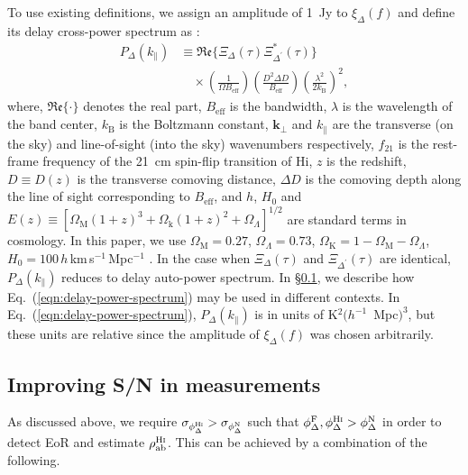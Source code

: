 \documentclass[
reprint,
superscriptaddress,
amsmath,
amssymb,
aps,
prd
]{revtex4-1}
\begin{document}
To use existing definitions, we assign an amplitude of 1~Jy to $\xi_\Delta(f)$ and define its delay cross-power spectrum as \cite{par12a,thy15a}:
\begin{align}
  P_\Delta(k_\parallel) &\equiv \mathfrak{Re}\bigg\{\Xi_\Delta(\tau)\Xi_{\Delta^\prime}^*(\tau)\bigg\} \nonumber\\
  &\quad \times \left(\frac{1}{\Omega B_\textrm{eff}}\right)\left(\frac{D^2\Delta D}{B_\textrm{eff}}\right)\left(\frac{\lambda^2}{2k_\textrm{B}}\right)^2, \label{eqn:delay-power-spectrum}
\end{align}
where, $\mathfrak{Re}\{\cdot\}$ denotes the real part, $B_\textrm{eff}$ is the bandwidth, $\lambda$ is the wavelength of the band center, $k_\textrm{B}$ is the Boltzmann constant, $\boldsymbol{k}_\perp$ and $k_\parallel$ are the transverse (on the sky) and line-of-sight (into the sky) wavenumbers respectively, $f_{21}$ is the rest-frame frequency of the 21~cm spin-flip transition of H{\sc i}, $z$ is the redshift, $D\equiv D(z)$ is the transverse comoving distance, $\Delta D$ is the comoving depth along the line of sight corresponding to $B_\textrm{eff}$, and $h$, $H_0$ and $E(z)\equiv [\Omega_\textrm{M}(1+z)^3+\Omega_\textrm{k}(1+z)^2+\Omega_\Lambda]^{1/2}$ are standard terms in cosmology. In this paper, we use $\Omega_\textrm{M}=0.27$, $\Omega_\Lambda=0.73$, $\Omega_\textrm{K}=1-\Omega_\textrm{M}-\Omega_\Lambda$, $H_0=100\,h\,$km$\,$s$^{-1}\,$Mpc$^{-1}$ \cite{wmap9cosmo}. In the case when $\Xi_\Delta(\tau)$ and $\Xi_{\Delta^\prime}(\tau)$ are identical, $P_\Delta(k_\parallel)$ reduces to delay auto-power spectrum. In \S\ref{sec:averaging}, we describe how Eq.~(\ref{eqn:delay-power-spectrum}) may be used in different contexts. In Eq.~(\ref{eqn:delay-power-spectrum}), $P_\Delta(k_\parallel)$ is in units of K$^2 (h^{-1}$~Mpc$)^3$, but these units are relative since the amplitude of $\xi_\Delta(f)$ was chosen arbitrarily. 

\subsection{Improving S/N in measurements}\label{sec:averaging}

As discussed above, we require $\sigma_{\phi_\Delta^\textrm{H{\sc i}}} > \sigma_{\phi_\Delta^\textrm{N}}$ such that $\phi_\Delta^\textrm{F}, \phi_\Delta^\textrm{H{\sc i}} > \phi_\Delta^\textrm{N}$ in order to detect EoR and estimate $\rho_\textrm{ab}^\textrm{H{\sc i}}$. This can be achieved by a combination of the following.
\end{document}
